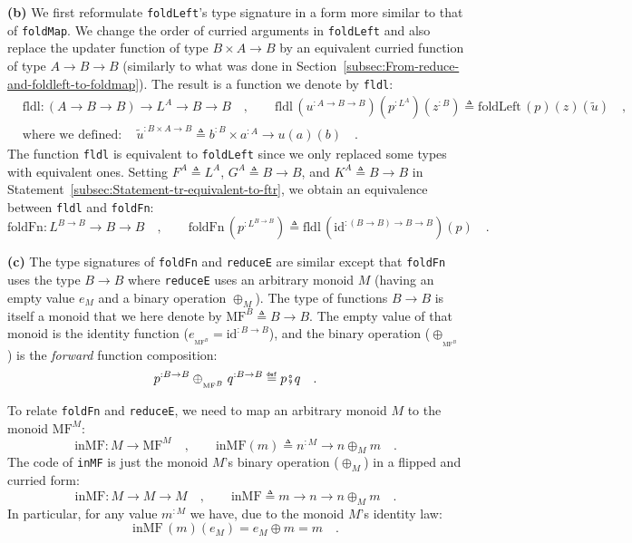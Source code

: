 \textbf{(b)} We first reformulate \lstinline!foldLeft!\textsf{'}s type signature
in a form more similar to that of \lstinline!foldMap!. We change
the order of curried arguments in \lstinline!foldLeft! and also replace
the updater function of type $B\times A\rightarrow B$ by an equivalent
curried function of type $A\rightarrow B\rightarrow B$ (similarly
to what was done in Section~\ref{subsec:From-reduce-and-foldleft-to-foldmap}).
The result is a function we denote by \lstinline!fldl!:
\begin{align*}
 & \text{fldl}:(A\rightarrow B\rightarrow B)\rightarrow L^{A}\rightarrow B\rightarrow B\quad,\quad\quad\text{fldl}\,(u^{:A\rightarrow B\rightarrow B})(p^{:L^{A}})(z^{:B})\triangleq\text{foldLeft}\,(p)(z)(\tilde{u})\quad,\\
 & \text{where we defined}:\quad\tilde{u}^{:B\times A\rightarrow B}\triangleq b^{:B}\times a^{:A}\rightarrow u\left(a\right)(b)\quad.
\end{align*}
The function \lstinline!fldl! is equivalent to \lstinline!foldLeft!
since we only replaced some types with equivalent ones. Setting $F^{A}\triangleq L^{A}$,
$G^{A}\triangleq B\rightarrow B$, and $K^{A}\triangleq B\rightarrow B$
in Statement~\ref{subsec:Statement-tr-equivalent-to-ftr}, we obtain
an equivalence between \lstinline!fldl! and \lstinline!foldFn!:
\[
\text{foldFn}:L^{B\rightarrow B}\rightarrow B\rightarrow B\quad,\quad\quad\text{foldFn}\,(p^{:L^{B\rightarrow B}})\triangleq\text{fldl}\,(\text{id}^{:(B\rightarrow B)\rightarrow B\rightarrow B})(p)\quad.
\]

\textbf{(c)} The type signatures of \lstinline!foldFn! and \lstinline!reduceE!
are similar except that \lstinline!foldFn! uses the type $B\rightarrow B$
where \lstinline!reduceE! uses an arbitrary monoid $M$ (having an
empty value $e_{M}$ and a binary operation $\oplus_{M}$). The type
of functions $B\rightarrow B$ is itself a monoid that we here denote
by $\text{MF}^{B}\triangleq B\rightarrow B$. The empty value of that
monoid is the identity function ($e_{_{\text{MF}^{B}}}=\text{id}^{:B\rightarrow B}$),
and the binary operation ($\ensuremath{\oplus}_{_{\text{MF}^{B}}}$)
is the \emph{forward} function composition: 
\[
p^{:B\rightarrow B}\oplus_{_{\text{MF}^{B}}}q^{:B\rightarrow B}\triangleq p\bef q\quad.
\]

To relate \lstinline!foldFn! and \lstinline!reduceE!, we need to
map an arbitrary monoid $M$ to the monoid $\text{MF}^{M}$:
\[
\text{inMF}:M\rightarrow\text{MF}^{M}\quad,\quad\quad\text{inMF}\left(m\right)\triangleq n^{:M}\rightarrow n\oplus_{M}m\quad.
\]
The code of \lstinline!inMF! is just the monoid $M$\textsf{'}s binary operation
($\oplus_{M}$) in a flipped and curried form:
\[
\text{inMF}:M\rightarrow M\rightarrow M\quad,\quad\quad\text{inMF}\triangleq m\rightarrow n\rightarrow n\oplus_{M}m\quad.
\]
In particular, for any value $m^{:M}$ we have, due to the monoid
$M$\textsf{'}s identity law: 
\begin{equation}
\text{inMF}\,(m)(e_{M})=e_{M}\oplus m=m\quad.\label{eq:identity-law-of-inMF}
\end{equation}

